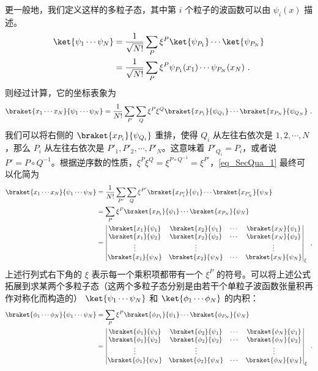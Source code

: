 更一般地，我们定义这样的多粒子态，其中第 $i$ 个粒子的波函数可以由 $\psi_i(x)$ 描述。
\begin{equation}
\begin{aligned}
\ket{\psi_1\cdots\psi_N}&=\frac{1}{\sqrt{N!}}\sum_P \xi^P\ket{\psi_{P_1}}\cdots \ket{\psi_{P_N}}\\
&=\frac{1}{\sqrt{N!}}\sum_P \xi^P\psi_{P_1}(x_1)\cdots \psi_{P_N}(x_N)~.
\end{aligned}
\end{equation}
则经过计算，它的坐标表象为
\begin{equation}\label{eq_SecQua_1}
\braket{x_1\cdots x_N}{\psi_1\cdots\psi_N}=\frac{1}{N!}\sum_P\sum_Q \xi^P \xi^Q \braket{x_{P_1}}{\psi_{Q_1}}\cdots\braket{x_{P_N}}{\psi_{Q_N}}~.
\end{equation}
我们可以将右侧的 $\braket{x_{P_i}}{\psi_{Q_i}}$ 重排，使得 $Q_i$ 从左往右依次是 $1,2,\cdots,N$，那么 $P_i$ 从左往右依次是 $P'_1,P'_2,\cdots,P'_N$。这意味着 $P'_{Q_i}=P_i$，或者说 $P'=P\circ Q^{-1}$。根据逆序数的性质，$\xi^P\xi^Q=\xi^{P\circ Q^{-1}}=\xi^{P'}$，\autoref{eq_SecQua_1}  最终可以化简为
\begin{equation}
\begin{aligned}
\braket{x_1\cdots x_N}{\psi_1\cdots\psi_N}&=\frac{1}{N!}\sum_{P'}\sum_Q \xi^{P'} \braket{x_{P'_1}}{\psi_{1}}\cdots\braket{x_{P'_N}}{\psi_{N}}\\
&=\sum_{P}\xi^P\braket{x_{P_1}}{\psi_{1}}\cdots\braket{x_{P_N}}{\psi_{N}}\\
&=\left|\begin{matrix}
\braket{x_1}{\psi_1} &\braket{x_2}{\psi_1} &\cdots &\braket{x_N}{\psi_1}\\
\braket{x_1}{\psi_2} &\braket{x_2}{\psi_2} &\cdots & \braket{x_N}{\psi_2}\\
\vdots & \vdots & & \vdots \\
\braket{x_1}{\psi_N} &\braket{x_2}{\psi_N} &\cdots & \braket{x_N}{\psi_N}
\end{matrix}\right|_\xi~,
\end{aligned}
\end{equation}
上述行列式右下角的 $\xi$ 表示每一个乘积项都带有一个 $\xi^P$ 的符号。可以将上述公式拓展到求某两个多粒子态（这两个多粒子态分别是由若干个单粒子波函数张量积再作对称化而构造的） $\ket{\psi_1\cdots\psi_N}$ 和 $\ket{\phi_1\cdots\phi_N}$ 的内积：
\begin{equation}\label{eq_SecQua_2}
\begin{aligned}
\braket{\phi_1\cdots \phi_N}{\psi_1\cdots\psi_N}
&=\sum_{P}\xi^P\braket{\phi_{P_1}}{\psi_{1}}\cdots\braket{\phi_{P_N}}{\psi_{N}}\\
&=\left|\begin{matrix}
\braket{\phi_1}{\psi_1} &\braket{\phi_2}{\psi_1} &\cdots &\braket{\phi_N}{\psi_1}\\
\braket{\phi_1}{\psi_2} &\braket{\phi_2}{\psi_2} &\cdots & \braket{\phi_N}{\psi_2}\\
\vdots & \vdots & & \vdots \\
\braket{\phi_1}{\psi_N} &\braket{\phi_2}{\psi_N} &\cdots & \braket{\phi_N}{\psi_N}
\end{matrix}\right|_\xi~.
\end{aligned}
\end{equation}
